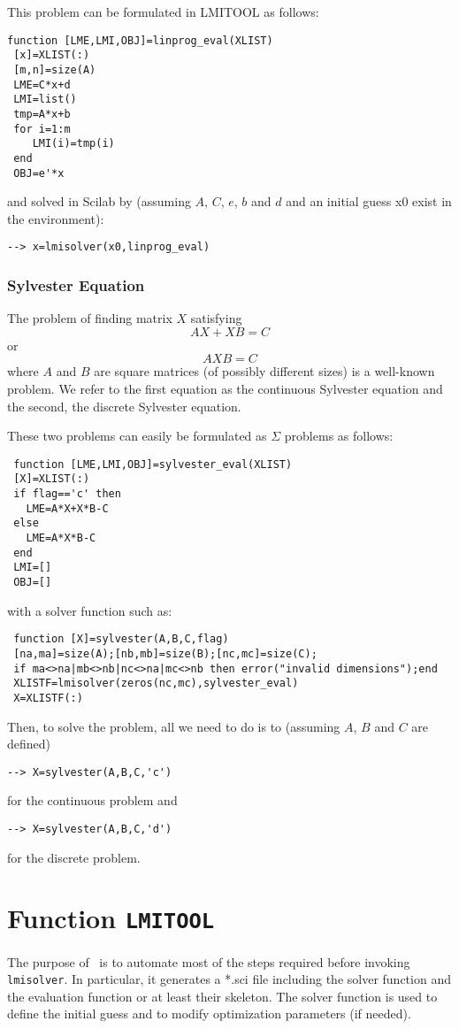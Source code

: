 \documentclass{article}
\begin{document}
This problem can be formulated in LMITOOL as follows:
\begin{verbatim}
function [LME,LMI,OBJ]=linprog_eval(XLIST)
 [x]=XLIST(:)
 [m,n]=size(A)
 LME=C*x+d
 LMI=list()
 tmp=A*x+b 
 for i=1:m
    LMI(i)=tmp(i)
 end
 OBJ=e'*x
\end{verbatim}
and solved in Scilab by (assuming $A$, $C$, $e$, $b$ and $d$ and
an initial guess x0 exist in the environment):
\begin{verbatim}
--> x=lmisolver(x0,linprog_eval)
\end{verbatim}

\subsubsection{Sylvester Equation}
\label{ex5}
The problem of finding matrix $X$ satisfying
\[
AX+XB = C
\]
or 
\[
AXB = C
\]
where $A$ and $B$ are square matrices (of possibly different sizes) is
a well-known problem. We refer to the first equation as the continuous
Sylvester equation and the second, the discrete Sylvester equation.

These two problems can easily be formulated as $\Sigma$ problems as
follows:
\begin{verbatim}
 function [LME,LMI,OBJ]=sylvester_eval(XLIST)
 [X]=XLIST(:)
 if flag=='c' then 
   LME=A*X+X*B-C
 else 
   LME=A*X*B-C
 end                                               
 LMI=[]                                                          
 OBJ=[]                                                          
\end{verbatim}
with a solver function such as:
\begin{verbatim}
 function [X]=sylvester(A,B,C,flag)
 [na,ma]=size(A);[nb,mb]=size(B);[nc,mc]=size(C);                                
 if ma<>na|mb<>nb|nc<>na|mc<>nb then error("invalid dimensions");end           
 XLISTF=lmisolver(zeros(nc,mc),sylvester_eval)
 X=XLISTF(:)
\end{verbatim}
Then, to solve the problem, all we need to do is to (assuming $A$, $B$
and $C$ are defined)
\begin{verbatim}
--> X=sylvester(A,B,C,'c')
\end{verbatim}
for the continuous problem and 
\begin{verbatim}
--> X=sylvester(A,B,C,'d')
\end{verbatim}
for the discrete problem.


\newpage

\section{Function {\tt LMITOOL}}
\label{s_lmitool}
The purpose of \lmitool\ is to automate most of the steps required before
invoking {\tt lmisolver}.  In particular, it generates a *.sci
file including the solver function and the evaluation function or at
least their skeleton. The solver function is used to define the
initial guess and to modify optimization parameters (if needed).
\end{document}
